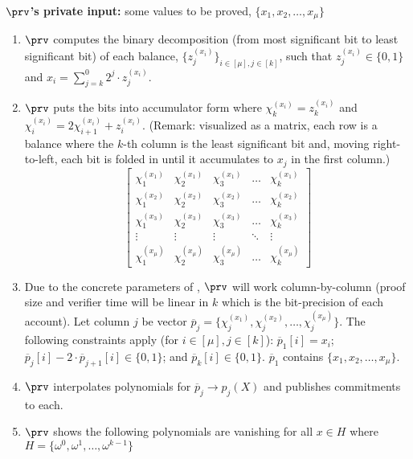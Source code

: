 

\begin{Protocol*}[t!]
\begin{mdframed}
\footnotesize


\textbf{$\prv$'s private input:} some values to be proved, $\{x_1,x_2,\dots,x_\mu\}$
\begin{enumerate}
    \item $\prv$ computes the binary decomposition (from most significant bit to least significant bit) of each balance, $\{z_j^{(x_i)}\}_{i\in[\mu],j\in[k]}$, such that $z_j^{(x_i)}\in\{0,1\}$ and $x_i=\sum_{j=k}^{0}2^j\cdot{z_j^{(x_i)}}$.
    \item $\prv$ puts the bits into accumulator form where $\chi_k^{(x_i)}=z_k^{(x_i)}$ and $\chi_i^{(x_i)}=2\chi_{i+1}^{(x_i)}+z_i^{(x_i)}$.  (Remark: visualized as a matrix, each row is a balance where the $k$-th column is the least significant bit and, moving right-to-left, each bit is folded in until it accumulates to $x_j$ in the first column.)
    \[\begin{bmatrix}
        \chi_1^{(x_1)} & \chi_2^{(x_1)} & \chi_3^{(x_1)} & \dots & \chi_k^{(x_1)} \\[3pt]
        \chi_1^{(x_2)} & \chi_2^{(x_2)} & \chi_3^{(x_2)} & \dots & \chi_k^{(x_2)} \\[3pt]
        \chi_1^{(x_3)} & \chi_2^{(x_3)} & \chi_3^{(x_3)} & \dots & \chi_k^{(x_3)} \\[3pt]
        \vdots & \vdots & \vdots & \ddots & \vdots \\[3pt]
        \chi_1^{(x_\mu)} & \chi_2^{(x_\mu)} & \chi_3^{(x_\mu)} & \dots & \chi_k^{(x_\mu)}
    \end{bmatrix}\]
    \item Due to the concrete parameters of \bls, $\prv$ will work column-by-column (proof size and verifier time will be linear in $k$ which is the bit-precision of each account). Let column $j$ be vector $\overline{p}_j=\{\chi_j^{(x_1)},\chi_j^{(x_2)},\dots,\chi_j^{(x_\mu)}\}$. The following constraints apply (for $i\in[\mu],j\in[k]$):       $\overline{p}_1[i]=x_i$; $\overline{p}_j[i] - 2\cdot\overline{p}_{j+1}[i]\in\{0,1\}$; and $\overline{p}_k[i]\in\{0,1\}$. $\overline{p}_1$ contains $\{x_1,x_2,\dots,x_\mu\}$.
	\item $\prv$ interpolates polynomials for $\overline{p}_j \rightarrow p_j(X)$ and publishes commitments to each.
    \item $\prv$ shows the following polynomials are vanishing for all $x\in{H}$ where $H=\{\omega^0,\omega^1,\dots,\omega^{k-1}\}$

\end{enumerate}
\end{mdframed}
\end{Protocol*}
